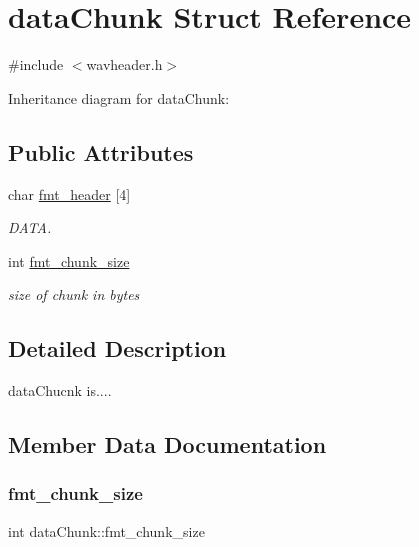 \hypertarget{structdataChunk}{}\section{data\+Chunk Struct Reference}
\label{structdataChunk}


{\ttfamily \#include $<$wavheader.\+h$>$}



Inheritance diagram for data\+Chunk\+:
\subsection*{Public Attributes}
\begin{DoxyCompactItemize}
\item 
char \hyperlink{structdataChunk_a846343045c6f7168e969f3a4f19a44e1}{fmt\+\_\+header} \mbox{[}4\mbox{]}
\begin{DoxyCompactList}\small\item\em D\+A\+TA. \end{DoxyCompactList}\item 
int \hyperlink{structdataChunk_ab34bbfab5f9c6f68319a493844219a2e}{fmt\+\_\+chunk\+\_\+size}
\begin{DoxyCompactList}\small\item\em size of chunk in bytes \end{DoxyCompactList}\end{DoxyCompactItemize}


\subsection{Detailed Description}
data\+Chucnk is.... 

\subsection{Member Data Documentation}
\mbox{\label{structdataChunk_ab34bbfab5f9c6f68319a493844219a2e}} 
\subsubsection{\texorpdfstring{fmt\+\_\+chunk\+\_\+size}{fmt\_chunk\_size}}
{\footnotesize\ttfamily int data\+Chunk\+::fmt\+\_\+chunk\+\_\+size}



